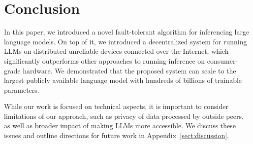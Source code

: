 \section{Conclusion}

In this paper, we introduced a novel fault-tolerant algorithm for inferencing large language models. On top of it, we introduced a decentralized system for running LLMs on distributed unreliable devices connected over the Internet, which significantly outperforms other approaches to running inference on consumer-grade hardware. We demonstrated that the proposed system can scale to the largest publicly available language model with hundreds of billions of trainable parameters.

While our work is focused on technical aspects, it is important to consider limitations of our approach, such as privacy of data processed by outside peers, as well as broader impact of making LLMs more accessible. We discuss these issues and outline directions for future work in Appendix~\ref{sect:discussion}.



